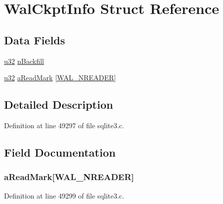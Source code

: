 \hypertarget{struct_wal_ckpt_info}{}\section{Wal\+Ckpt\+Info Struct Reference}
\label{struct_wal_ckpt_info}
\subsection*{Data Fields}
\begin{DoxyCompactItemize}
\item 
\hyperlink{sqlite3_8c_a03ad5adfaeb9b7640dde78a0cc390319}{u32} \hyperlink{struct_wal_ckpt_info_ab6a7ab4000490f2f9c6cb1c1ba893a47}{n\+Backfill}
\item 
\hyperlink{sqlite3_8c_a03ad5adfaeb9b7640dde78a0cc390319}{u32} \hyperlink{struct_wal_ckpt_info_a0fc9b638da08504acf0e52ef729977ce}{a\+Read\+Mark} \mbox{[}\hyperlink{sqlite3_8c_a07fdcff8ba16a6a679a65ff4956087f6}{W\+A\+L\+\_\+\+N\+R\+E\+A\+D\+E\+R}\mbox{]}
\end{DoxyCompactItemize}


\subsection{Detailed Description}


Definition at line 49297 of file sqlite3.\+c.



\subsection{Field Documentation}
\hypertarget{struct_wal_ckpt_info_a0fc9b638da08504acf0e52ef729977ce}{}
\subsubsection[{a\+Read\+Mark}]{ a\+Read\+Mark\mbox{[}{\bf W\+A\+L\+\_\+\+N\+R\+E\+A\+D\+E\+R}\mbox{]}}\label{struct_wal_ckpt_info_a0fc9b638da08504acf0e52ef729977ce}


Definition at line 49299 of file sqlite3.\+c.

\hypertarget{struct_wal_ckpt_info_ab6a7ab4000490f2f9c6cb1c1ba893a47}{}
